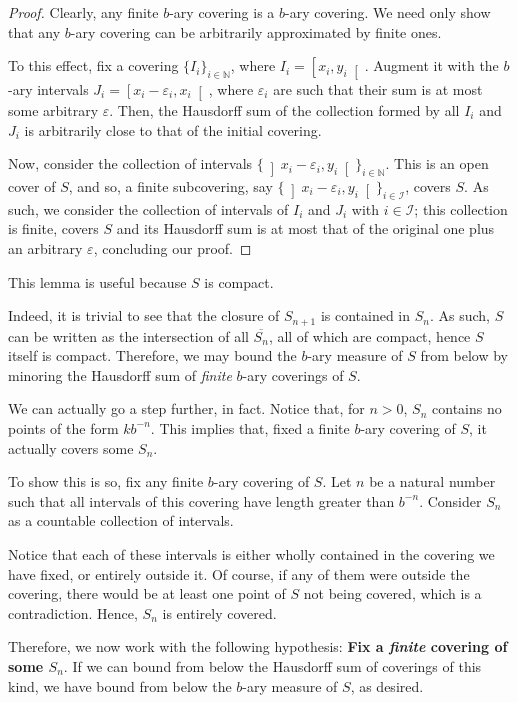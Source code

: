 \documentclass[11pt, reqno]{amsart}
\newcommand{\N}{\mathbb{N}}
\begin{document}
\begin{proof}
Clearly, any finite $b$-ary covering is a $b$-ary covering. We need only show that any $b$-ary covering can be arbitrarily approximated by finite ones.

To this effect, fix a covering $\{ I_i \}_{i \in \N}$, where $I_i = \left[x_i, y_i \right[$. Augment it with the $b$-ary intervals $J_i = \left[x_i - \varepsilon_i, x_i \right[$, where $\varepsilon_i$ are such that their sum is at most some arbitrary $\varepsilon$. Then, the Hausdorff sum of the collection formed by all $I_i$ and $J_i$ is arbitrarily close to that of the initial covering.

Now, consider the collection of intervals $\{ \left]x_i - \varepsilon_i, y_i \right[ \}_{i \in \N}$. This is an open cover of $S$, and so, a finite subcovering, say $\{ \left]x_i - \varepsilon_i, y_i \right[ \}_{i \in \mathcal{I}}$, covers $S$. As such, we consider the collection of intervals of $I_i$ and $J_i$ with $i \in \mathcal{I}$; this collection is finite, covers $S$ and its Hausdorff sum is at most that of the original one plus an arbitrary $\varepsilon$, concluding our proof.
\end{proof}

This lemma is useful because $S$ is compact.

Indeed, it is trivial to see that the closure of $S_{n+1}$ is contained in $S_n$. As such, $S$ can be written as the intersection of all $\overline{S_n}$, all of which are compact, hence $S$ itself is compact. Therefore, we may bound the $b$-ary measure of $S$ from below by minoring the Hausdorff sum of \emph{finite} $b$-ary coverings of $S$.

We can actually go a step further, in fact. Notice that, for $n > 0$, $S_n$ contains no points of the form $k b^{-n}$. This implies that, fixed a finite $b$-ary covering of $S$, it actually covers some $S_n$.

To show this is so, fix any finite $b$-ary covering of $S$. Let $n$ be a natural number such that all intervals of this covering have length greater than $b^{-n}$. Consider $S_n$ as a countable collection of intervals.

Notice that each of these intervals is either wholly contained in the covering we have fixed, or entirely outside it. Of course, if any of them were outside the covering, there would be at least one point of $S$ not being covered, which is a contradiction. Hence, $S_n$ is entirely covered.

Therefore, we now work with the following hypothesis: \textbf{Fix a \emph{finite} covering of some $S_n$}. If we can bound from below the Hausdorff sum of coverings of this kind, we have bound from below the $b$-ary measure of $S$, as desired.
\end{document}
